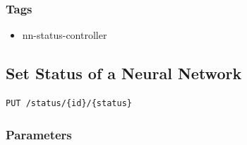 \subsubsection{Tags}\label{tags-11}

\begin{itemize}
\tightlist
\item
  nn-status-controller
\end{itemize}

\subsection{Set Status of a Neural
Network}\label{set-status-of-a-neural-network}

\begin{verbatim}
PUT /status/{id}/{status}
\end{verbatim}

\subsubsection{Parameters}\label{parameters-9}

